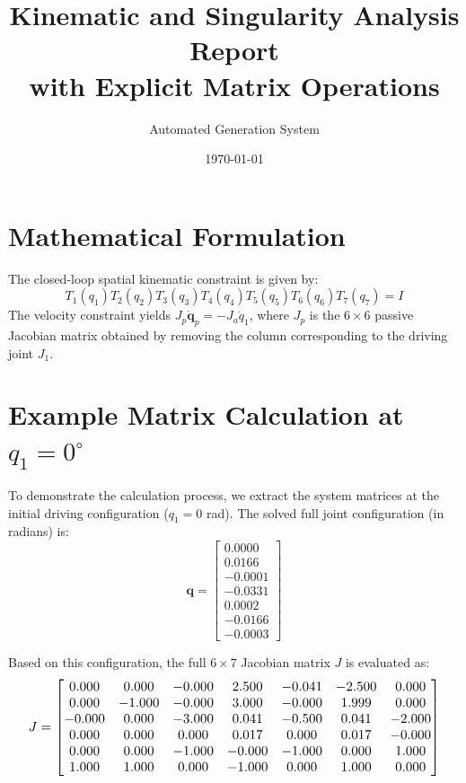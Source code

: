 \documentclass[12pt,a4paper]{article}
\title{\textbf{Kinematic and Singularity Analysis Report \\ with Explicit Matrix Operations}}
\author{Automated Generation System}
\date{\today}
\begin{document}
\maketitle

\section{Mathematical Formulation}
The closed-loop spatial kinematic constraint is given by:
\begin{equation}
    T_1(q_1) T_2(q_2) T_3(q_3) T_4(q_4) T_5(q_5) T_6(q_6) T_7(q_7) = I
\end{equation}
The velocity constraint yields $J_p \dot{\mathbf{q}}_p = - J_a \dot{q}_1$, where $J_p$ is the $6 \times 6$ passive Jacobian matrix obtained by removing the column corresponding to the driving joint $J_1$.

\section{Example Matrix Calculation at $q_1 = 0^\circ$}
To demonstrate the calculation process, we extract the system matrices at the initial driving configuration ($q_1 = 0$ rad). The solved full joint configuration (in radians) is:
\begin{equation}
    \mathbf{q} = \begin{bmatrix} 0.0000 \\ 0.0166 \\ -0.0001 \\ -0.0331 \\ 0.0002 \\ -0.0166 \\ -0.0003 \end{bmatrix}
\end{equation}

Based on this configuration, the full $6 \times 7$ Jacobian matrix $J$ is evaluated as:
\begin{equation}
    \resizebox{0.95\textwidth}{!}{$ J = \begin{bmatrix}
  0.000 & 0.000 & -0.000 & 2.500 & -0.041 & -2.500 & 0.000 \\
  0.000 & -1.000 & -0.000 & 3.000 & -0.000 & 1.999 & 0.000 \\
  -0.000 & 0.000 & -3.000 & 0.041 & -0.500 & 0.041 & -2.000 \\
  0.000 & 0.000 & 0.000 & 0.017 & 0.000 & 0.017 & -0.000 \\
  0.000 & 0.000 & -1.000 & -0.000 & -1.000 & 0.000 & 1.000 \\
  1.000 & 1.000 & 0.000 & -1.000 & 0.000 & 1.000 & 0.000
\end{bmatrix} $}
\end{equation}
\end{document}
